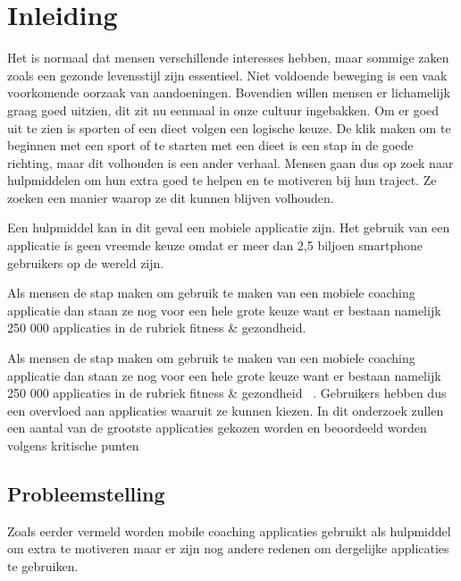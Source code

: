 
\chapter{Inleiding}
\label{ch:inleiding}

Het is normaal dat mensen verschillende interesses hebben, maar sommige zaken zoals een gezonde levensstijl zijn essentieel. Niet voldoende beweging is een vaak voorkomende oorzaak van aandoeningen. Bovendien willen mensen er lichamelijk graag goed uitzien, dit zit nu eenmaal in onze cultuur ingebakken. Om er goed uit te zien is sporten of een dieet volgen een logische keuze. De klik maken om te beginnen met een sport of te starten met een dieet is een stap in de goede richting, maar dit volhouden is een ander verhaal. Mensen gaan dus op zoek naar hulpmiddelen om hun extra goed te helpen en te motiveren bij hun traject. Ze zoeken een manier waarop ze dit kunnen blijven volhouden.

Een hulpmiddel kan in dit geval een mobiele applicatie zijn. Het gebruik van een applicatie is geen vreemde keuze omdat er meer dan 2,5 biljoen smartphone gebruikers op de wereld zijn. ~\autocite{Statista2018}

Als mensen de stap maken om gebruik te maken van een mobiele coaching applicatie dan staan ze nog voor een hele grote keuze want er bestaan namelijk 250 000 applicaties in de rubriek fitness \& gezondheid.  ~\autocite{Statista2018}

Als mensen de stap maken om gebruik te maken van een mobiele coaching applicatie dan staan ze nog voor een hele grote keuze want er bestaan namelijk 250 000 applicaties in de rubriek fitness \& gezondheid ~\autocite{Statista2018}. Gebruikers hebben dus een overvloed aan applicaties waaruit ze kunnen kiezen. In dit onderzoek zullen een aantal van de grootste applicaties gekozen worden en beoordeeld worden volgens kritische punten
\newpage
\section{Probleemstelling}
\label{sec:probleemstelling}

Zoals eerder vermeld worden mobile coaching applicaties gebruikt als hulpmiddel om extra te motiveren maar er zijn nog andere redenen om dergelijke applicaties te gebruiken.

